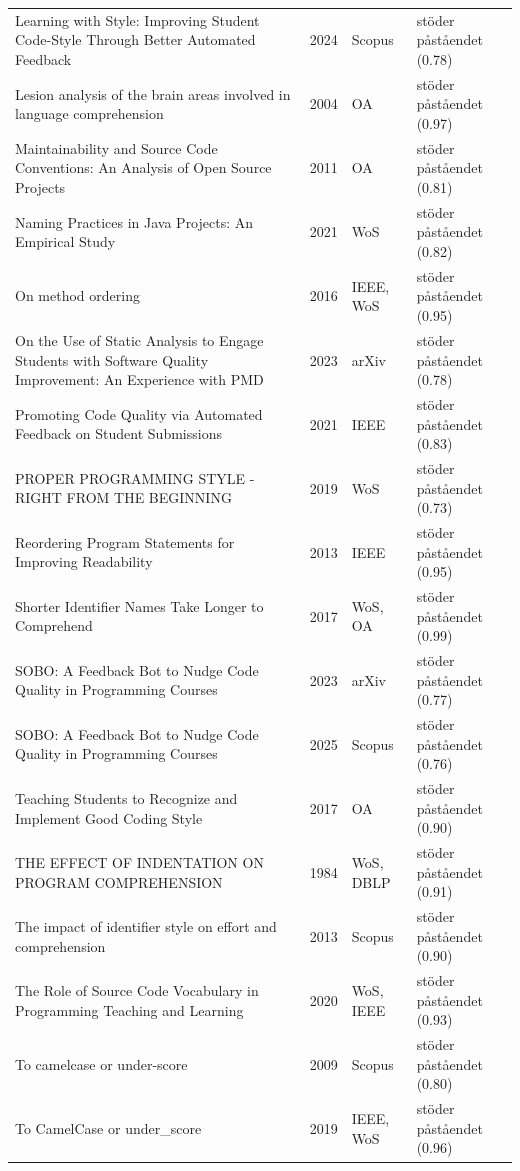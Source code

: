 \begin{longtable}{@{}%
  >{\raggedright\arraybackslash}p{}c%
  >{\raggedright\arraybackslash}p{}%
  >{\raggedright\arraybackslash}p{}@{}}
Learning with Style: Improving Student Code-Style Through Better Automated Feedback & 2024 & Scopus & stöder påståendet (0.78) \\
Lesion analysis of the brain areas involved in language comprehension & 2004 & OA & stöder påståendet (0.97) \\
Maintainability and Source Code Conventions: An Analysis of Open Source Projects & 2011 & OA & stöder påståendet (0.81) \\
Naming Practices in Java Projects: An Empirical Study & 2021 & WoS & stöder påståendet (0.82) \\
On method ordering & 2016 & IEEE, WoS & stöder påståendet (0.95) \\
On the Use of Static Analysis to Engage Students with Software Quality Improvement: An Experience with PMD & 2023 & arXiv & stöder påståendet (0.78) \\
Promoting Code Quality via Automated Feedback on Student Submissions & 2021 & IEEE & stöder påståendet (0.83) \\
PROPER PROGRAMMING STYLE - RIGHT FROM THE BEGINNING & 2019 & WoS & stöder påståendet (0.73) \\
Reordering Program Statements for Improving Readability & 2013 & IEEE & stöder påståendet (0.95) \\
Shorter Identifier Names Take Longer to Comprehend & 2017 & WoS, OA & stöder påståendet (0.99) \\
SOBO: A Feedback Bot to Nudge Code Quality in Programming Courses & 2023 & arXiv & stöder påståendet (0.77) \\
SOBO: A Feedback Bot to Nudge Code Quality in Programming Courses & 2025 & Scopus & stöder påståendet (0.76) \\
Teaching Students to Recognize and Implement Good Coding Style & 2017 & OA & stöder påståendet (0.90) \\
THE EFFECT OF INDENTATION ON PROGRAM COMPREHENSION & 1984 & WoS, DBLP & stöder påståendet (0.91) \\
The impact of identifier style on effort and comprehension & 2013 & Scopus & stöder påståendet (0.90) \\
The Role of Source Code Vocabulary in Programming Teaching and Learning & 2020 & WoS, IEEE & stöder påståendet (0.93) \\
To camelcase or under-score & 2009 & Scopus & stöder påståendet (0.80) \\
To CamelCase or under\_score & 2019 & IEEE, WoS & stöder påståendet (0.96) \\

\end{longtable}
